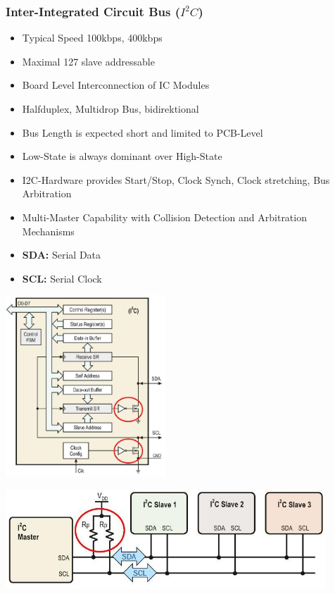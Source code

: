 \subsubsection{Inter-Integrated Circuit Bus ($I^2C$)}
\begin{minipage}{13cm}
	\begin{itemize}
		\item Typical Speed 100kbps, 400kbps
		\item Maximal 127 slave addressable
		\item Board Level Interconnection of IC Modules
		\item Halfduplex, Multidrop Bus, bidirektional
		\item Bus Length is expected short and limited to PCB-Level
		\item Low-State is always dominant over High-State
		\item \acs{I2C}-Hardware provides Start/Stop, Clock Synch, Clock stretching, Bus Arbitration
		\item Multi-Master Capability with Collision Detection and Arbitration Mechanisms
		\item \textbf{\acs{SDA}: }Serial Data
		\item \textbf{\acs{SCL}: }Serial Clock
	\end{itemize}
\end{minipage}
\begin{minipage}{6cm}
	\includegraphics[width=6cm]{images/i2c_internal}
\end{minipage}
\includegraphics[width=12cm]{images/i2c_1}
